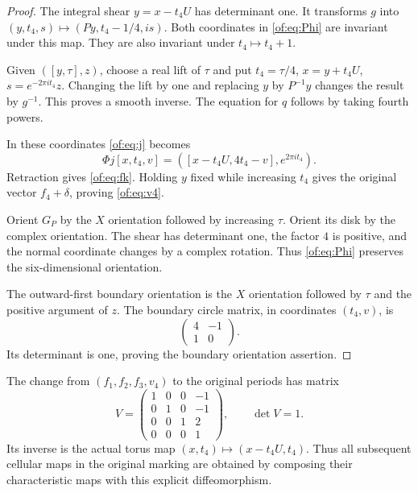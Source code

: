 \begin{proof}
The integral shear $y=x-t_4U$ has determinant one.
It transforms $g$ into $(y,t_4,s)\mapsto(Py,t_4-1/4,is)$.
Both coordinates in \eqref{of:eq:Phi} are invariant under this map.
They are also invariant under $t_4\mapsto t_4+1$.

Given $([y,\tau],z)$, choose a real lift of $\tau$ and put
$t_4=\tau/4$, $x=y+t_4U$, $s=e^{-2\pi it_4}z$.
Changing the lift by one and replacing $y$ by $P^{-1}y$ changes the
result by $g^{-1}$. This proves a smooth inverse.
The equation for $q$ follows by taking fourth powers.

In these coordinates \eqref{of:eq:j} becomes
\[
 \Phi j[x,t_4,v]=([x-t_4U,4t_4-v],e^{2\pi it_4}).
\]
Retraction gives \eqref{of:eq:fk}. Holding $y$ fixed while increasing
$t_4$ gives the original vector $f_4+\delta$, proving \eqref{of:eq:v4}.

Orient $G_P$ by the $X$ orientation followed by increasing $\tau$.
Orient its disk by the complex orientation. The shear has determinant one,
the factor $4$ is positive, and the normal coordinate changes by a complex
rotation. Thus \eqref{of:eq:Phi} preserves the six-dimensional orientation.

The outward-first boundary orientation is the $X$ orientation followed by
$\tau$ and the positive argument of $z$.
The boundary circle matrix, in coordinates $(t_4,v)$, is
\begin{equation}\label{of:eq:boundary-matrix}
                   \begin{pmatrix}4&-1\\1&0\end{pmatrix}.
\end{equation}
Its determinant is one, proving the boundary orientation assertion.
\end{proof}

The change from $(f_1,f_2,f_3,v_4)$ to the original periods has matrix
\begin{equation}\label{of:eq:V}
 V=\begin{pmatrix}1&0&0&-1\\0&1&0&-1\\0&0&1&2\\0&0&0&1\end{pmatrix},
 \qquad \det V=1.
\end{equation}
Its inverse is the actual torus map $(x,t_4)\mapsto(x-t_4U,t_4)$.
Thus all subsequent cellular maps in the original marking are obtained
by composing their characteristic maps with this explicit diffeomorphism.

